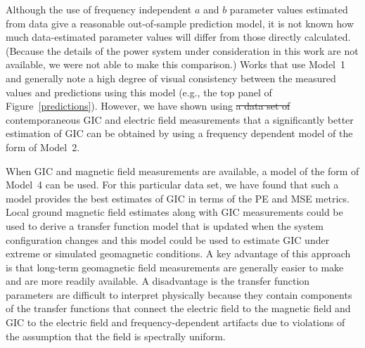 \documentclass[draft,linenumbers]{agujournal2018}
\providecommand{\DIFdeltex}[1]{{\protect\color{red}\sout{#1}}}                      %
\providecommand{\DIFdelbegin}{} %
\providecommand{\DIFdelend}{} %
\providecommand{\DIFdel}[1]{\texorpdfstring{\DIFdeltex{#1}}{}} %
\begin{document}
Although the use of frequency independent $a$ and $b$ parameter values estimated from data give a reasonable out-of-sample prediction model, it is not known how much data-estimated parameter values will differ from those directly calculated. (Because the details of the power system under consideration in this work are not available, we were not able to make this comparison.) Works that use Model~1 and generally note a high degree of visual consistency between the measured values and predictions using this model (e.g., the top panel of Figure~\ref{predictions}). However, we have shown using \DIFdelbegin \DIFdel{a data set of }\DIFdelend contemporaneous GIC and electric field measurements that a significantly better estimation of GIC can be obtained by using a frequency dependent model of the form of Model~2. 


When GIC and magnetic field measurements are available, a model of the form of Model~4 can be used. For this particular data set, we have found that such a model provides the best estimates of GIC in terms of the PE and MSE metrics. Local ground magnetic field estimates along with GIC measurements could be used to derive a transfer function model that is updated when the system configuration changes and this model could be used to estimate GIC under extreme or simulated geomagnetic conditions. A key advantage of this approach is that long-term geomagnetic field measurements are generally easier to make and are more readily available. A disadvantage is the transfer function parameters are difficult to interpret physically because they contain components of the transfer functions that connect the electric field to the magnetic field and GIC to the electric field and frequency-dependent artifacts due to violations of the assumption that the field is spectrally uniform.

\DIFdelbegin %
\end{document}
